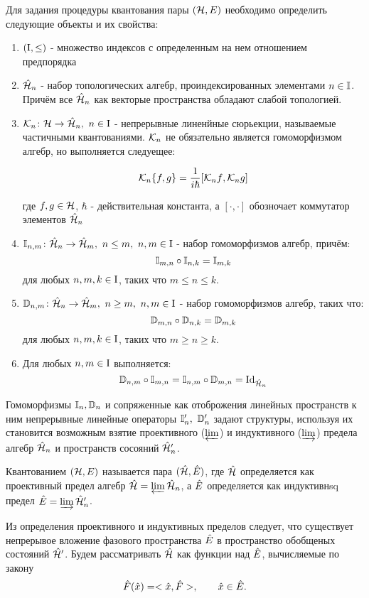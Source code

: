 \documentclass[10pt,a4paper]{article}
\begin{document}
Для задания процедуры квантования пары $(\mathcal{H},E)$ необходимо определить следующие объекты и их свойства:
\begin{enumerate}

\item $(\operatorname{I},\leq)$ - множество индексов с определенным на нем отношением предпорядка

\item $\hat{\mathcal{H}}_n$ - набор топологических алгебр, проиндексированных элементами $n\in\mathbb{I}$. Причём все $\hat{\mathcal{H}}_n$ как векторые пространства обладают слабой топологией.

\item $\mathcal{K}_n\colon\mathcal{H}\to\hat{\mathcal{H}}_n,\ n\in \operatorname{I}$ - непрерывные линенйные сюрьекции, называемые частичными квантованиями. $\mathcal{K}_n$ не обязательно является гомоморфизмом алгебр, но выполняется следуещее:

\[\mathcal{K}_n \{ {f},{g}\}=\frac{1}{i\hbar}[{\mathcal{K}_n f},{\mathcal{K}_n g}]\]

где $f,g\in\mathcal{H}$, $\hbar$ - действительная константа, а $[\cdot,\cdot]$ обозночает коммутатор элементов $\hat{\mathcal{H}}_n$
\item $\mathbb{I}_{n,m}\colon\hat{\mathcal{H}}_n\to\hat{\mathcal{H}}_m,\ n\leq m,\ n,m\in\operatorname{I}$ - набор  гомоморфизмов алгебр, причём:
\[\mathbb{I}_{m,n}\circ\mathbb{I}_{n,k}=\mathbb{I}_{m,k}\]
для любых $n,m,k\in\operatorname{I}$, таких что $m\leq n\leq k$.

\item $\mathbb{D}_{n,m}\colon\hat{\mathcal{H}}_n\to\hat{\mathcal{H}}_m,\ n\geq m,\ n,m\in\operatorname{I}$ - набор  гомоморфизмов алгебр, таких что:
\[\mathbb{D}_{m,n}\circ\mathbb{D}_{n,k}=\mathbb{D}_{m,k}\]
для любых $n,m,k\in\operatorname{I}$, таких что $m\geq n\geq k$.

\item Для любых $n,m\in\operatorname{I}$ выполняется:
\[\mathbb{D}_{n,m}\circ\mathbb{I}_{m,n} = \mathbb{I}_{n,m}\circ\mathbb{D}_{m,n} = \operatorname{Id}_{\hat{\mathcal{H}}_n}\]

\end{enumerate}

Гомоморфизмы $\mathbb{I}_n,\mathbb{D}_n$ и сопряженные как отоброжения линейных пространств к ним непрерывные линейные операторы $\mathbb{I}_n',\ \mathbb{D}_n'$ задают структуры, используя их становится возможным взятие проективного ($\varprojlim$) и индуктивного ($\varinjlim$) предела алгебр $\hat{\mathcal{H}}_n$ и пространств сосояний $ \hat{\mathcal{H}}_n' $.
\begin{definition}
Квантованием  $(\mathcal{H},E)$ называется пара $(\hat{\mathcal{H}},\hat{E})$, где $\hat{\mathcal{H}}$ определяется как проективный предел алгебр $\hat{\mathcal{H}}=\varprojlim \hat{\mathcal{H}}_n$, а $\hat{E}$ определяется как индуктивнsq предел $\hat{E}=\varinjlim\hat{\mathcal{H}}_n'$.
\end{definition}

Из определения проективного и индуктивных пределов следует, что существует непрерывое вложение фазового пространства $\hat{E}$ в пространство обобщеных состояний $\hat{\mathcal{H}}'$. Будем рассматривать $\hat{\mathcal{H}}$ как функции над $\hat{E}$, вычисляемые по закону
\[\hat{F}(\hat{x})=<{\hat{x}},{\hat{F}}>,\qquad\hat{x}\in\hat{E}.\]
\end{document}
